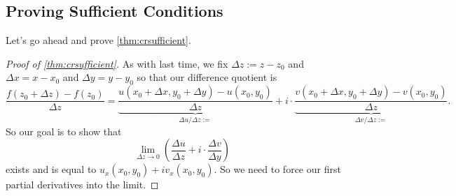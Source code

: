 \subsection{Proving Sufficient Conditions}
Let's go ahead and prove \autoref{thm:crsufficient}.
\begin{proof}[Proof of \autoref{thm:crsufficient}]
	As with last time, we fix $\Delta z:=z-z_0$ and $\Delta x=x-x_0$ and $\Delta y=y-y_0$ so that our difference quotient is
	\[\frac{f(z_0+\Delta z)-f(z_0)}{\Delta z}=\underbrace{\frac{u(x_0+\Delta x,y_0+\Delta y)-u(x_0,y_0)}{\Delta z}}_{\Delta u/\Delta z:=}+i\cdot\underbrace{\frac{v(x_0+\Delta x,y_0+\Delta y)-v(x_0,y_0)}{\Delta z}}_{\Delta v/\Delta z:=}.\]
	So our goal is to show that
	\[\lim_{\Delta z\to0}\left(\frac{\Delta u}{\Delta z}+i\cdot\frac{\Delta v}{\Delta y}\right)\]
	exists and is equal to $u_x(x_0,y_0)+iv_x(x_0,y_0)$. So we need to force our first partial derivatives into the limit.


\end{proof}
